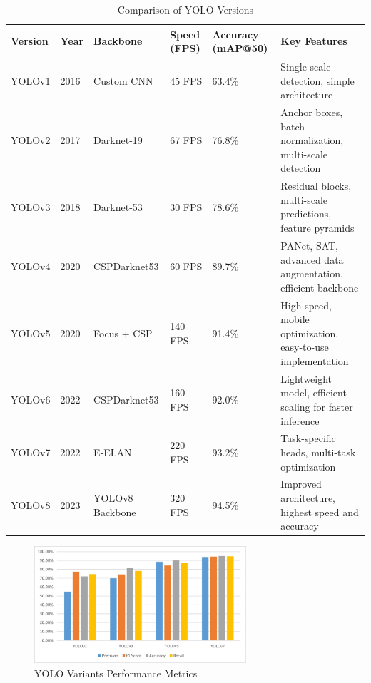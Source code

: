 %
\begin{table}[ht]
\centering
\caption{Comparison of YOLO Versions}
\vspace{5pt} 
\begin{tabular}{|p{1.8cm}|p{1.2cm}|p{2.5cm}|p{1.8cm}|p{1.8cm}|p{5.5cm}|} 
\hline
\textbf{Version} & \textbf{Year} & \textbf{Backbone} & \textbf{Speed (FPS)} & \textbf{Accuracy \small{(mAP@50)}} & \textbf{Key Features} \\ \hline
YOLOv1  & 2016 & Custom CNN       & 45 FPS   & 63.4\%  & Single-scale detection, simple architecture \\ \hline
YOLOv2  & 2017 & Darknet-19       & 67 FPS   & 76.8\%  & Anchor boxes, batch normalization, multi-scale detection \\ \hline
YOLOv3  & 2018 & Darknet-53       & 30 FPS   & 78.6\%  & Residual blocks, multi-scale predictions, feature pyramids \\ \hline
YOLOv4  & 2020 & CSPDarknet53     & 60 FPS   & 89.7\%  & PANet, SAT, advanced data augmentation, efficient backbone \\ \hline
YOLOv5  & 2020 & Focus + CSP      & 140 FPS  & 91.4\%  & High speed, mobile optimization, easy-to-use implementation \\ \hline
YOLOv6  & 2022 & CSPDarknet53     & 160 FPS  & 92.0\%  & Lightweight model, efficient scaling for faster inference \\ \hline
YOLOv7  & 2022 & E-ELAN           & 220 FPS  & 93.2\%  & Task-specific heads, multi-task optimization \\ \hline
YOLOv8  & 2023 & YOLOv8 Backbone  & 320 FPS  & 94.5\%  & Improved architecture, highest speed and accuracy \\ \hline
\end{tabular}
\end{table}
%
  \begin{figure}[h!]
    \centering
    \includegraphics[width=0.7\textwidth]{images/Yolo Variants Performance Metrics.png}
    \caption{YOLO Variants Performance Metrics}
    \label{fig:enter-label}
  \end{figure}
%
%
%